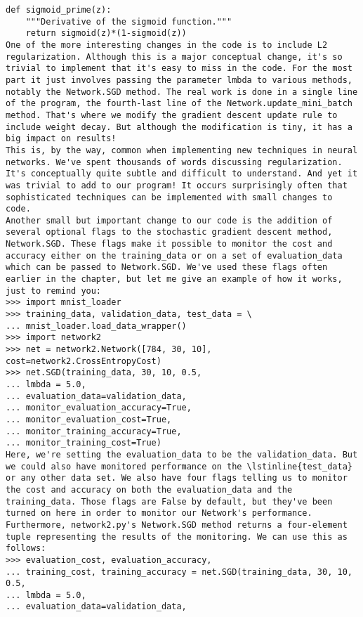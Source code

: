 \begin{lstlisting}
def sigmoid_prime(z):
    """Derivative of the sigmoid function."""
    return sigmoid(z)*(1-sigmoid(z))
One of the more interesting changes in the code is to include L2 regularization. Although this is a major conceptual change, it's so trivial to implement that it's easy to miss in the code. For the most part it just involves passing the parameter lmbda to various methods, notably the Network.SGD method. The real work is done in a single line of the program, the fourth-last line of the Network.update_mini_batch method. That's where we modify the gradient descent update rule to include weight decay. But although the modification is tiny, it has a big impact on results!
This is, by the way, common when implementing new techniques in neural networks. We've spent thousands of words discussing regularization. It's conceptually quite subtle and difficult to understand. And yet it was trivial to add to our program! It occurs surprisingly often that sophisticated techniques can be implemented with small changes to code.
Another small but important change to our code is the addition of several optional flags to the stochastic gradient descent method, Network.SGD. These flags make it possible to monitor the cost and accuracy either on the training_data or on a set of evaluation_data which can be passed to Network.SGD. We've used these flags often earlier in the chapter, but let me give an example of how it works, just to remind you:
>>> import mnist_loader
>>> training_data, validation_data, test_data = \
... mnist_loader.load_data_wrapper()
>>> import network2
>>> net = network2.Network([784, 30, 10], cost=network2.CrossEntropyCost)
>>> net.SGD(training_data, 30, 10, 0.5,
... lmbda = 5.0,
... evaluation_data=validation_data,
... monitor_evaluation_accuracy=True,
... monitor_evaluation_cost=True,
... monitor_training_accuracy=True,
... monitor_training_cost=True)
Here, we're setting the evaluation_data to be the validation_data. But we could also have monitored performance on the \lstinline{test_data} or any other data set. We also have four flags telling us to monitor the cost and accuracy on both the evaluation_data and the training_data. Those flags are False by default, but they've been turned on here in order to monitor our Network's performance. Furthermore, network2.py's Network.SGD method returns a four-element tuple representing the results of the monitoring. We can use this as follows:
>>> evaluation_cost, evaluation_accuracy, 
... training_cost, training_accuracy = net.SGD(training_data, 30, 10, 0.5,
... lmbda = 5.0,
... evaluation_data=validation_data,

\end{lstlisting}
